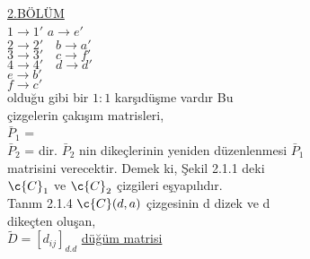 \documentclass[11pt]{amsbook}
\begin{document}
\underline{2.B\"{O}L\"{U}M  \hspace{6cm}}\\
$1 \rightarrow 1'$ \quad  $ a \rightarrow e' $\\
$2 \rightarrow 2' \quad b \rightarrow a'$\\
$3 \rightarrow 3' \quad c \rightarrow f'$\\
$4 \rightarrow 4' \quad d \rightarrow d'$\\
\indent \quad \quad   $e \rightarrow b'$\\
\indent \quad \quad   $f \rightarrow c'$\\

oldu\u{g}u gibi bir $1:1$ kar\c{s}{\i}d\"{u}\c{s}me vard{\i}r Bu\\
\c{c}izgelerin \c{c}ak{\i}\c{s}{\i}m matrisleri,\\
$\bar{P}_1$ = \\
$\bar{P}_2$ = 
dir. $\bar{P}_2$ nin dike\c{c}lerinin yeniden d\"{u}zenlenmesi $\bar{P}_1$\\
matrisini verecektir. Demek ki, \c{S}ekil 2.1.1 deki\\
$\c{C}_1$ ve $\c{C}_2$ \c{c}izgileri e\c{s}yap{\i}l{\i}d{\i}r.\\
Tanım 2.1.4 $\c{C}(d,a)$ \c{c}izgesinin d dizek ve d \\
dike\c{c}ten olu\c{s}an,\\
$\tilde{D}=[d_{ij}]_{d.d} $ \underline{d\"{u}\u{g}\"{u}m matrisi}
\end{document}
